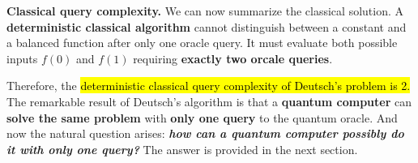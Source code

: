 \highspace
\textcolor{Red2}{ \textbf{Classical query complexity.}} We can now summarize the classical solution. A \textbf{deterministic classical algorithm} cannot distinguish between a constant and a balanced function after only one oracle query. It must evaluate both possible inputs $f(0)$ and $f(1)$ requiring \textbf{exactly two orcale queries}.

\highspace
Therefore, the \hl{deterministic classical query complexity of Deutsch's problem is 2.} The remarkable result of Deutsch's algorithm is that a \textbf{quantum computer} can \textbf{solve the same problem} with \textbf{only one query} to the quantum oracle. And now the natural question arises: \emph{\textbf{how can a quantum computer possibly do it with only one query?}} The answer is provided in the next section.